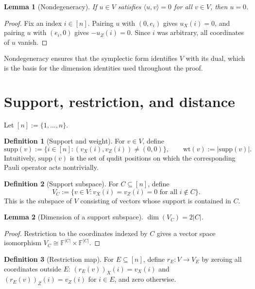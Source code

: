 \documentclass[11pt]{article}
\theoremstyle{plain}
\newtheorem{lemma}{Lemma}
\theoremstyle{definition}
\newtheorem{definition}{Definition}
\newcommand{\F}{\mathbb{F}}
\newcommand{\supp}{\mathrm{supp}}
\newcommand{\wt}{\mathrm{wt}}
\begin{document}
\begin{lemma}[Nondegeneracy]\label{lem:nondeg}
If $u \in V$ satisfies $\langle u, v \rangle = 0$ for all $v \in V$, then $u = 0$.
\end{lemma}

\begin{proof}
Fix an index $i \in [n]$.  Pairing $u$ with $(0, e_i)$ gives $u_X(i) = 0$, and pairing $u$
with $(e_i, 0)$ gives $-u_Z(i) = 0$.  Since $i$ was arbitrary, all coordinates of $u$ vanish.
\end{proof}

Nondegeneracy ensures that the symplectic form identifies $V$ with its dual, which is the
basis for the dimension identities used throughout the proof.


\section{Support, restriction, and distance}\label{sec:support}

Let $[n] := \{1, \dots, n\}$.

\begin{definition}[Support and weight]
For $v \in V$, define
\[
  \supp(v) := \{ i \in [n] : (v_X(i), v_Z(i)) \neq (0,0) \},
  \qquad
  \wt(v) := |\supp(v)|.
\]
Intuitively, $\supp(v)$ is the set of qudit positions on which the corresponding Pauli
operator acts nontrivially.
\end{definition}

\begin{definition}[Support subspace]
For $C \subseteq [n]$, define
\[
  V_C := \{ v \in V : v_X(i) = v_Z(i) = 0 \text{ for all } i \notin C \}.
\]
This is the subspace of $V$ consisting of vectors whose support is contained in $C$.
\end{definition}

\begin{lemma}[Dimension of a support subspace]\label{lem:dimVC}
$\dim(V_C) = 2|C|$.
\end{lemma}

\begin{proof}
Restriction to the coordinates indexed by $C$ gives a vector space isomorphism
$V_C \cong \F^{|C|} \times \F^{|C|}$.
\end{proof}

\begin{definition}[Restriction map]
For $E \subseteq [n]$, define $r_E : V \to V_E$ by zeroing all coordinates outside $E$:
$(r_E(v))_X(i) = v_X(i)$ and $(r_E(v))_Z(i) = v_Z(i)$ for $i \in E$, and zero otherwise.
\end{definition}
\end{document}

